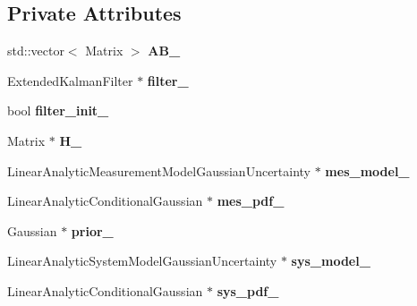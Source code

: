 \subsection*{\-Private \-Attributes}
\begin{DoxyCompactItemize}
\item 
std\-::vector$<$ \-Matrix $>$ {\bf \-A\-B\-\_\-}
\item 
\-Extended\-Kalman\-Filter $\ast$ {\bf filter\-\_\-}
\item 
bool {\bf filter\-\_\-init\-\_\-}
\item 
\-Matrix $\ast$ {\bf \-H\-\_\-}
\item 
\-Linear\-Analytic\-Measurement\-Model\-Gaussian\-Uncertainty $\ast$ {\bf mes\-\_\-model\-\_\-}
\item 
\-Linear\-Analytic\-Conditional\-Gaussian $\ast$ {\bf mes\-\_\-pdf\-\_\-}
\item 
\-Gaussian $\ast$ {\bf prior\-\_\-}
\item 
\-Linear\-Analytic\-System\-Model\-Gaussian\-Uncertainty $\ast$ {\bf sys\-\_\-model\-\_\-}
\item 
\-Linear\-Analytic\-Conditional\-Gaussian $\ast$ {\bf sys\-\_\-pdf\-\_\-}
\end{DoxyCompactItemize}


